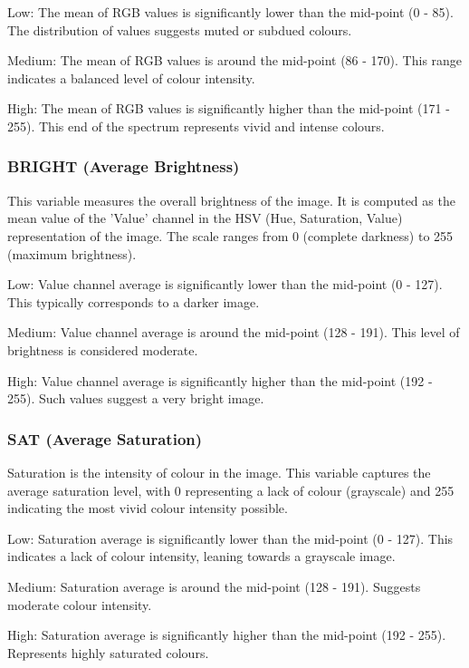 \begin{description}[leftmargin=2.5cm, style=multiline, labelwidth=1.5cm]
\item[1] Low: The mean of RGB values is significantly lower than the mid-point (0 - 85). The distribution of values suggests muted or subdued colours.
\item[2] Medium: The mean of RGB values is around the mid-point (86 - 170). This range indicates a balanced level of colour intensity.
\item[3] High: The mean of RGB values is significantly higher than the mid-point (171 - 255). This end of the spectrum represents vivid and intense colours.
\end{description}

\subsubsection*{BRIGHT (Average Brightness)}
This variable measures the overall brightness of the image. It is computed as the mean value of the 'Value' channel in the HSV (Hue, Saturation, Value) representation of the image. The scale ranges from 0 (complete darkness) to 255 (maximum brightness).

\begin{description}[leftmargin=2.5cm, style=multiline, labelwidth=1.5cm]
\item[1] Low: Value channel average is significantly lower than the mid-point (0 - 127). This typically corresponds to a darker image.
\item[2] Medium: Value channel average is around the mid-point (128 - 191). This level of brightness is considered moderate.
\item[3] High: Value channel average is significantly higher than the mid-point (192 - 255). Such values suggest a very bright image.
\end{description}

\subsubsection*{SAT (Average Saturation)}
Saturation is the intensity of colour in the image. This variable captures the average saturation level, with 0 representing a lack of colour (grayscale) and 255 indicating the most vivid colour intensity possible.

\begin{description}[leftmargin=2.5cm, style=multiline, labelwidth=1.5cm]
\item[1] Low: Saturation average is significantly lower than the mid-point (0 - 127). This indicates a lack of colour intensity, leaning towards a grayscale image.
\item[2] Medium: Saturation average is around the mid-point (128 - 191). Suggests moderate colour intensity.
\item[3] High: Saturation average is significantly higher than the mid-point (192 - 255). Represents highly saturated colours.
\end{description}

